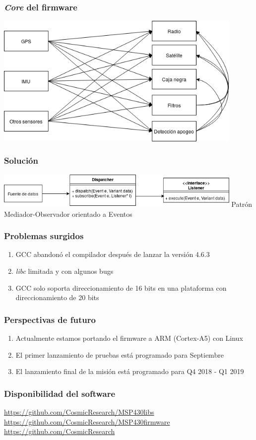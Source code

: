 \documentclass[numfooter]{beamer}
\begin{document}
    \begin{frame}
        \frametitle{\textit{Core} del firmware}
        \centering
        \includegraphics[width=0.9\textwidth]{images/problema.png}
    \end{frame}
    \begin{frame}
        \frametitle{Solución}
        \centering
        \includegraphics[width=0.9\textwidth]{images/solucion.png}
        \vfill
        Patrón Mediador-Observador orientado a Eventos
    \end{frame}
    \begin{frame}
        \frametitle{Problemas surgidos}
        \begin{enumerate}
            \item GCC abandonó el compilador después de lanzar la versión 4.6.3
            \item \textit{libc} limitada y con algunos bugs
            \item GCC solo soporta direccionamiento de 16 bits en una plataforma con direccionamiento de 20 bits
        \end{enumerate}
    \end{frame}
    \begin{frame}
        \frametitle{Perspectivas de futuro}
        \begin{enumerate}
            \item Actualmente estamos portando el firmware a ARM (Cortex-A5) con Linux
            \item El primer lanzamiento de pruebas está programado para Septiembre
            \item El lanzamiento final de la misión está programado para Q4 2018 - Q1 2019
        \end{enumerate}
    \end{frame}
    \begin{frame}
        \frametitle{Disponibilidad del software}
        \url{https://github.com/CosmicResearch/MSP430libs} \\
        \url{https://github.com/CosmicResearch/MSP430firmware} \\
        \url{https://github.com/CosmicResearch}
    \end{frame}
    
\end{document}

